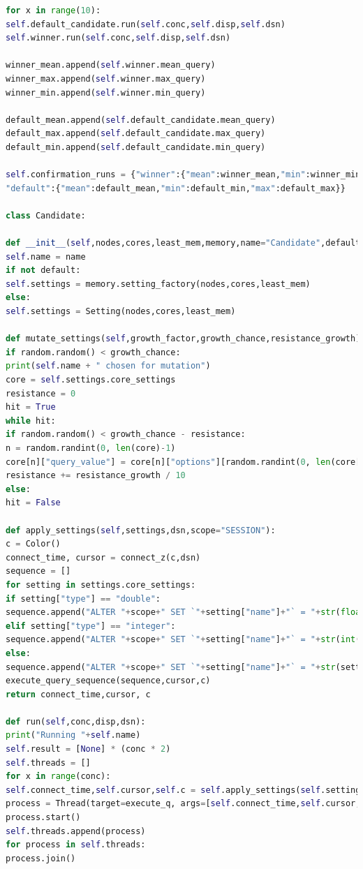\documentclass[a4paper,english]{report}
\begin{document}
\begin{lstlisting}[language=Python, caption=class\_definition.py\, the file defining all the algorithmic operations done during a optimization process.]
for x in range(10):
self.default_candidate.run(self.conc,self.disp,self.dsn)
self.winner.run(self.conc,self.disp,self.dsn)

winner_mean.append(self.winner.mean_query)
winner_max.append(self.winner.max_query)
winner_min.append(self.winner.min_query)

default_mean.append(self.default_candidate.mean_query)
default_max.append(self.default_candidate.max_query)
default_min.append(self.default_candidate.min_query)

self.confirmation_runs = {"winner":{"mean":winner_mean,"min":winner_min,"max":winner_max},
"default":{"mean":default_mean,"min":default_min,"max":default_max}}

class Candidate:

def __init__(self,nodes,cores,least_mem,memory,name="Candidate",default=False): 
self.name = name
if not default:
self.settings = memory.setting_factory(nodes,cores,least_mem) 
else:
self.settings = Setting(nodes,cores,least_mem) 

def mutate_settings(self,growth_factor,growth_chance,resistance_growth): 
if random.random() < growth_chance:
print(self.name + " chosen for mutation")
core = self.settings.core_settings
resistance = 0
hit = True
while hit:
if random.random() < growth_chance - resistance:
n = random.randint(0, len(core)-1)
core[n]["query_value"] = core[n]["options"][random.randint(0, len(core[n]["options"])-1)]
resistance += resistance_growth / 10
else:
hit = False

def apply_settings(self,settings,dsn,scope="SESSION"):
c = Color()
connect_time, cursor = connect_z(c,dsn)
sequence = []
for setting in settings.core_settings:
if setting["type"] == "double":
sequence.append("ALTER "+scope+" SET `"+setting["name"]+"` = "+str(float(setting["query_value"])))
elif setting["type"] == "integer":
sequence.append("ALTER "+scope+" SET `"+setting["name"]+"` = "+str(int(setting["query_value"])))
else:
sequence.append("ALTER "+scope+" SET `"+setting["name"]+"` = "+str(setting["query_value"]))
execute_query_sequence(sequence,cursor,c)
return connect_time,cursor, c

def run(self,conc,disp,dsn):
print("Running "+self.name)
self.result = [None] * (conc * 2)
self.threads = []
for x in range(conc):
self.connect_time,self.cursor,self.c = self.apply_settings(self.settings,dsn)
process = Thread(target=execute_q, args=[self.connect_time,self.cursor,dsn,self.c,disp,x,self.result])
process.start()
self.threads.append(process)
for process in self.threads:
process.join()


\end{lstlisting}
\end{document}
